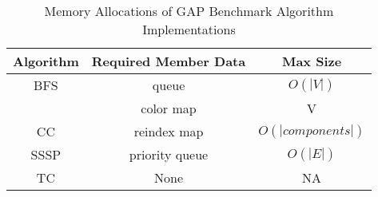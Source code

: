 \begin{table}[h!]
\centering
\begin{tabular}{| c | c | c |}
\hline
Algorithm & Required Member Data & Max Size \\\hline
BFS  & queue          & $O(|V|)$ \\
     & color map      & V \\\hline
CC   & reindex map    & $O(|components|)$ \\\hline
SSSP & priority queue & $O(|E|)$\\\hline
TC   & None          & N\/A\\
\hline
\end{tabular}
\caption{Memory Allocations of GAP Benchmark Algorithm Implementations}
\label{tab:internalmem}
\end{table}
